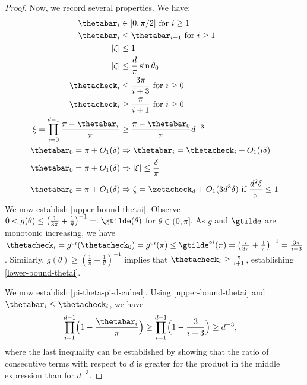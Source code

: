 \begin{proof}
Now, we record several properties.  We have:
\begin{align}
\thetabar_{i} &\in [0, \pi/2] \text{ for } i \geq 1 \notag \\
\thetabar_{i} &\leq \thetabar_{i-1} \text{ for } i \geq 1 \notag\\
 |\xi| &\leq 1 \label{bound-c-one}\\
| \zeta| &\leq \frac{d}{\pi} \sin \theta_0 \label{zeta-bound-d-sin-theta} \\
\thetacheck_i &\leq \frac{3\pi}{i+3} \text{ for $i \geq 0$} \label{upper-bound-thetai}\\
\thetacheck_i &\geq \frac{\pi}{i+1} \text{ for $i \geq 0$} \label{lower-bound-thetai}\\
\xi = \prod_{i=0}^{d-1} \frac{\pi - \thetabar_i}{\pi} &\geq \frac{\pi - \thetabar_0}{\pi } d^{-3} \label{pi-theta-pi-d-cubed}\\
\thetabar_0 = \pi + O_1(\delta) &\Rightarrow \thetabar_i = \thetacheck_i + O_1(i \delta) \label{thetabar-thetacheck-bound}\\
\thetabar_0 = \pi + O_1(\delta) &\Rightarrow |\xi| \leq \frac{\delta}{\pi} \label{c-one-bound-thetabarzero}\\
\thetabar_0 = \pi + O_1(\delta) &\Rightarrow \zeta = \zetacheck_d + O_1(3 d^3 \delta) \text{ if } \frac{d^2 \delta}{\pi} \leq 1 \label{high-theta-zeta-zetabar-control}
\end{align}
We now establish \eqref{upper-bound-thetai}.  Observe $0< g(\theta) \leq \bigl( \frac{1}{3 \pi} + \frac{1}{\theta} \bigr)^{-1} =: \gtilde(\theta)$ for $\theta \in (0, \pi]$.  As $g$ and $\gtilde$ are monotonic increasing, we have $\thetacheck_i = g^{\circ i}(\thetacheck_0) = g^{\circ i}(\pi) \leq \gtilde^{\circ i}(\pi) = \bigl( \frac{i}{3 \pi} + \frac{1}{\pi} \bigr)^{-1} = \frac{3\pi}{i + 3}$.  Similarly, $g(\theta) \geq (\frac{1}{\pi} + \frac{1}{\theta})^{-1}$ implies that $\thetacheck_i \geq \frac{\pi}{i+1}$, establishing \eqref{lower-bound-thetai}. 

We now establish \eqref{pi-theta-pi-d-cubed}.  Using \eqref{upper-bound-thetai} and $\thetabar_i \leq \thetacheck_i$, we have
\begin{align*}
\prod_{i=1}^{d-1} \Bigl(1 - \frac{\thetabar_i}{\pi} \Bigr) &\geq \prod_{i=1}^{d-1} \Bigl(1 - \frac{3}{i+3}  \Bigr)
\geq d^{-3},
\end{align*}
where the last inequality can be established by showing that the ratio of consecutive terms with respect to $d$ is greater for the product in the middle expression than for $d^{-3}$.


\end{proof}
